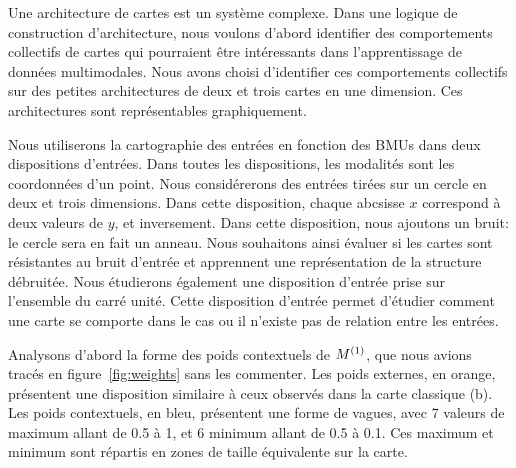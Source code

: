Une architecture de cartes est un système complexe. 
Dans une logique de construction d'architecture, nous voulons d'abord identifier des comportements collectifs de cartes qui pourraient être intéressants dans l'apprentissage de données multimodales.
Nous avons choisi d'identifier ces comportements collectifs sur des petites architectures de deux et trois cartes en une dimension. Ces architectures sont représentables graphiquement.

Nous utiliserons la cartographie des entrées en fonction des BMUs dans deux dispositions d'entrées.
Dans toutes les dispositions, les modalités sont les coordonnées d'un point.
Nous considérerons des entrées tirées sur un cercle en deux et trois dimensions.
Dans cette disposition, chaque abcsisse $x$ correspond à deux valeurs de $y$, et inversement.
Dans cette disposition, nous ajoutons un bruit: le cercle sera en fait un anneau. Nous souhaitons ainsi évaluer si les cartes sont résistantes au bruit d'entrée et apprennent une représentation de la structure débruitée.
Nous étudierons également une disposition d'entrée prise sur l'ensemble du carré unité. Cette disposition d'entrée permet d'étudier comment une carte se comporte dans le cas ou il n'existe pas de relation entre les entrées.


Analysons d'abord la forme des poids contextuels de $M^{({1})}$, que nous avions tracés en figure~\ref{fig:weights} sans les commenter. Les poids externes, en orange, présentent une disposition similaire à ceux observés dans la carte classique (b). Les poids contextuels, en bleu, présentent une forme de vagues, avec 7 valeurs de maximum allant de 0.5 à 1, et 6 minimum allant de 0.5 à 0.1. Ces maximum et minimum sont répartis en zones de taille équivalente sur la carte. 

